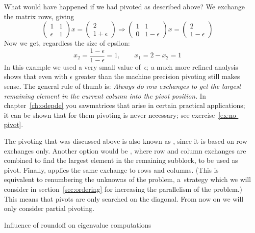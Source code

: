 What would have happened if we had pivoted as described above?
We exchange the matrix rows, giving
\[ 
  \begin{pmatrix}
    1&1\\ \epsilon&1
  \end{pmatrix} x =
  \begin{pmatrix}
    2\\1+\epsilon
  \end{pmatrix}
\Rightarrow
  \begin{pmatrix}
    1&1\\ 0&1-\epsilon
  \end{pmatrix} x=
    \begin{pmatrix}
      2\\ 1-\epsilon
    \end{pmatrix}
\]
Now we get, regardless the size of epsilon:
\[ x_2=\frac{1-\epsilon}{1-\epsilon}=1,\qquad
x_1=2-x_2=1
\]
In this example we used a very small value of~$\epsilon$; a much more
refined analysis shows that even with $\epsilon$ greater than the
machine precision pivoting still makes sense. The general rule of
thumb is: \emph{Always do row exchanges to get the largest remaining
  element in the current column into the pivot position.} In
chapter~\ref{ch:odepde} you sawmatrices that arise in certain
practical applications; it can be shown that for them pivoting is
never necessary; see exercise~\ref{ex:no-pivot}.

The pivoting that was discussed above is also known as
, since it is
based on row exchanges only.  Another option would be
, where row and column exchanges are
combined to find the largest element in the remaining subblock, to be
used as pivot. Finally,  applies the
same exchange to rows and columns. (This is equivalent to renumbering
the unknowns of the problem, a~strategy which we will consider in
section~\ref{sec:ordering} for increasing the parallelism of the problem.)
This means that pivots are only
searched on the diagonal.
From now on we will only consider partial pivoting.


 {Influence of roundoff on eigenvalue computations}


